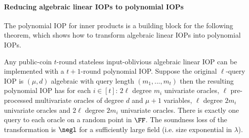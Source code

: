 \paragraph{Reducing algebraic linear IOPs to polynomial IOPs} 
The polynomial IOP for inner products is a building block for the following theorem, which shows how to transform algebraic linear IOPs into polynomial IOPs.
\label{sec:algebraicIOP}
\begin{theorem}\label{thm:algebraicIOPcompiler}
Any public-coin $t$-round stateless input-oblivious algebraic linear IOP can be implemented with a $t+1$-round polynomial IOP. Suppose the original $\ell$-query IOP is $(\mu,d)$ algebraic with query length $(m_1,...,m_t)$ then the resulting polynomial IOP has for each $i \in [t]$: $2\ell$ degree $m_i$ univariate oracles, $\ell$ pre-processed multivariate oracles of degree $d$ and $\mu+1$ variables, $\ell$ degree $2m_i$ univariate oracles %
and $2\ell$ degree $2m_i$ univariate oracles. %
There is exactly one query to each oracle on a random point in $\FF$. The soundness loss of the transformation is $\negl$ for a sufficiently large field (i.e. size exponential in $\lambda$).
\end{theorem}
